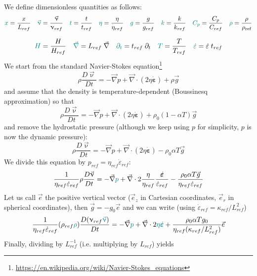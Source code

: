 We define {\color{teal}dimensionless} quantities as follows:
\begin{equation}
{\color{teal}x} = \frac{x}{L_{ref}}
\quad
{\color{teal}\vec\upnu} = \frac{\vec\upnu}{\upnu_{ref}}
\quad
{\color{teal}t} = \frac{t}{t_{ref}}
\quad
{\color{teal} \eta} = \frac{\eta}{\eta_{ref}}
\quad
{\color{teal} g} =\frac{g}{g_{ref}}
\quad
{\color{teal} k} = \frac{k}{k_{ref}}
\quad
{\color{teal} C_p} = \frac{C_p}{C_{ref}}
\quad
{\color{teal} \rho} =\frac{\rho}{\rho_{\text{ref}}}
\end{equation}

\begin{equation}
{\color{teal} H} = \frac{H}{H_{ref}}
\quad
{\color{teal} \vec\nabla} = L_{ref}\; \vec\nabla
\quad
{\color{teal} \partial_t} = t_{ref}\; \partial_t 
\quad
{\color{teal} T} = \frac{T}{T_{ref}}
\quad
{\color{teal} \dot{\varepsilon}} = \dot{\varepsilon} \; t_{ref}
\label{eq:physics_adimrels}
\end{equation}
We start from the standard Navier-Stokes equation\footnote{\url{https://en.wikipedia.org/wiki/Navier-Stokes_equations}}
\[
\rho \frac{D \vec\upnu}{D t}
=
-\vec\nabla p + \vec\nabla \cdot (2 \eta \dot{\bm\varepsilon})
+ \rho \vec{g} 
\]
and assume that the density is temperature-dependent (Boussinesq approximation) so that
\[
\rho \frac{D \vec\upnu}{D t}
=
-\vec\nabla p + \vec\nabla \cdot (2 \eta \dot{\bm\varepsilon})
+ \rho_0(1-\alpha T) \vec{g} 
\]
and remove the hydrostatic pressure (although we keep using $p$ for simplicity, $p$ is now the dynamic pressure):
\[
\rho \frac{D \vec\upnu}{D t}
=
-\vec\nabla p + \vec\nabla \cdot (2 \eta \dot{\bm\varepsilon})
- \rho_0\alpha T \vec{g} 
\]
We divide this equation by $p_{ref}=\eta_{ref}\dot{\varepsilon}_{ref}$:
\[
\frac{1}{\eta_{ref}\dot{\varepsilon}_{ref}} \rho
\frac{D \vec\upnu}{D t} 
=
-\vec\nabla {\color{teal}p} + \vec\nabla \cdot 2 \frac{\eta}{\eta_{ref}} \frac{\dot{\bm\varepsilon}}{\dot{\varepsilon}_{ref}}
- \frac{\rho_0\alpha T \vec{g}}{\eta_{ref} \dot{\varepsilon}_{ref}} 
\]
Let us call $\vec{e}$ the positive vertical vector ($\vec{e}_z$ in Cartesian coordinates, $\vec{e}_r$ in spherical coordinates), then 
$\vec{g} = -g_0 \vec{e}$ and we can write  (using $\dot{\varepsilon}_{ref}=\kappa_{ref}/L^2_{ref}$)
\[
\frac{1 }{\eta_{ref}\dot{\varepsilon}_{ref}}
(\rho_{ref}{\color{teal}\rho})\frac{D(\upnu_{ref} {\color{teal}\vec\upnu})}{D t}
=
-\vec\nabla {\color{teal}p} + \vec\nabla \cdot 2 {\color{teal} \eta} {\color{teal} \dot{\bm\varepsilon}}
+ \frac{\rho_0\alpha T g_0 }{\eta_{ref} (\kappa_{ref}/ L_{ref}^2)} \vec{e}
\]
Finally, dividing by $L_{ref}^{-1}$ (i.e. multiplying by $L_{ref}$) yields
